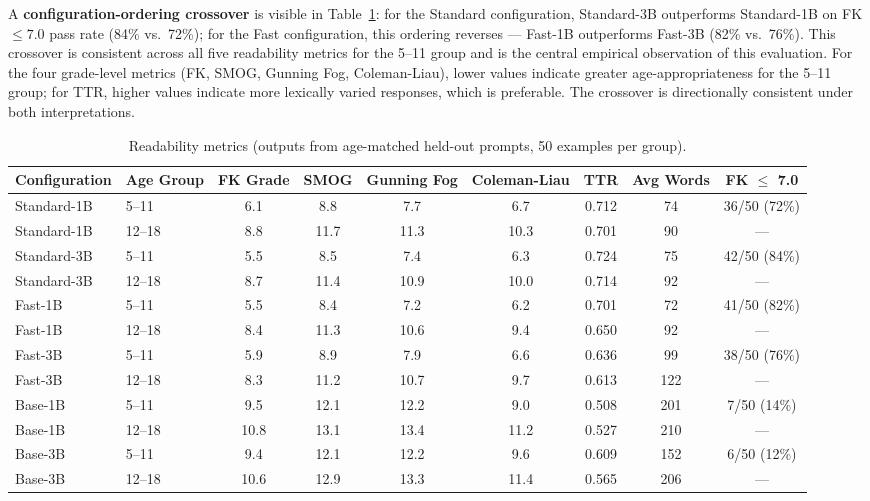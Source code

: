 \documentclass[AMA,Times1COL]{WileyNJDv5} %
\begin{document}
A \textbf{configuration-ordering crossover} is visible in Table~\ref{tab:res2}: for the Standard configuration, Standard-3B outperforms Standard-1B on FK $\leq 7.0$ pass rate (84\% vs.\ 72\%); for the Fast configuration, this ordering reverses --- Fast-1B outperforms Fast-3B (82\% vs.\ 76\%). This crossover is consistent across all five readability metrics for the 5--11 group and is the central empirical observation of this evaluation. For the four grade-level metrics (FK, SMOG, Gunning Fog, Coleman-Liau), lower values indicate greater age-appropriateness for the 5--11 group; for TTR, higher values indicate more lexically varied responses, which is preferable. The crossover is directionally consistent under both interpretations.

\begin{table}[!t]
  \caption{Readability metrics (outputs from age-matched held-out prompts, 50 examples per group).}
  \label{tab:res2}
  \footnotesize
  \begin{tabular}{llccccccc}
    \hline
    Configuration & Age Group & FK Grade & SMOG & Gunning Fog & Coleman-Liau & TTR & Avg Words & FK $\leq$ 7.0 \\
    \hline
    Standard-1B & 5--11  & 6.1  & 8.8  & 7.7  & 6.7  & 0.712 & 74  & 36/50 (72\%) \\
    Standard-1B & 12--18 & 8.8  & 11.7 & 11.3 & 10.3 & 0.701 & 90  & ---          \\
    Standard-3B & 5--11  & 5.5  & 8.5  & 7.4  & 6.3  & 0.724 & 75  & 42/50 (84\%) \\
    Standard-3B & 12--18 & 8.7  & 11.4 & 10.9 & 10.0 & 0.714 & 92  & ---          \\
    Fast-1B     & 5--11  & 5.5  & 8.4  & 7.2  & 6.2  & 0.701 & 72  & 41/50 (82\%) \\
    Fast-1B     & 12--18 & 8.4  & 11.3 & 10.6 & 9.4  & 0.650 & 92  & ---          \\
    Fast-3B     & 5--11  & 5.9  & 8.9  & 7.9  & 6.6  & 0.636 & 99  & 38/50 (76\%) \\
    Fast-3B     & 12--18 & 8.3  & 11.2 & 10.7 & 9.7  & 0.613 & 122 & ---          \\
    Base-1B     & 5--11  & 9.5  & 12.1 & 12.2 & 9.0  & 0.508 & 201 & 7/50 (14\%)  \\
    Base-1B     & 12--18 & 10.8 & 13.1 & 13.4 & 11.2 & 0.527 & 210 & ---          \\
    Base-3B     & 5--11  & 9.4  & 12.1 & 12.2 & 9.6  & 0.609 & 152 & 6/50 (12\%)  \\
    Base-3B     & 12--18 & 10.6 & 12.9 & 13.3 & 11.4 & 0.565 & 206 & ---          \\
    \hline
  \end{tabular}
\end{table}
\end{document}
